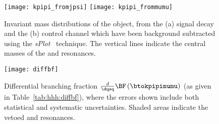 \begin{figure}
  \begin{center}
    \texttt{[image: kpipi\_fromjpsi]}
    \texttt{[image: kpipi\_frommumu]}
    \caption{\small
      Invariant mass distributions of the \kpipi object, from the
      (a) signal decay \btokpipimumu and the
      (b) control channel \btojpsikpipi which have been background subtracted
      using the \emph{sPlot}~\cite{splot} technique.
      The vertical lines indicate the central masses of the  and 
      resonances.
    }
    \label{fig:hhh:kpipi}
  \end{center}
\end{figure}



\begin{figure}
  \begin{center}
    \texttt{[image: diffbf]}
    \caption{\small
      Differential branching fraction $\tfrac{d}{\dqsq}\BF\left(\btokpipimumu\right)$
      (as given in Table~\protect\ref{tab:hhh:diffbf}), where the
      errors shown include both statistical and systematic uncertainties.
      Shaded areas indicate the vetoed \jpsi and \psitwos resonances.
    }
    \label{fig}
  \end{center}
\end{figure}





